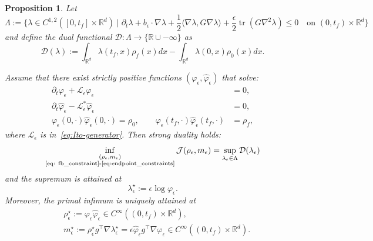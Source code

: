 \documentclass[10pt,a4paper]{amsart}
\newtheorem{proposition}{Proposition}
\newcommand{\R}{\mathbb{R}}
\newcommand{\map}[3]{#1:#2 \rightarrow #3}
\begin{document}
\begin{proposition}\label{prop: Strong duality and attainment}
Let 
\begin{equation}\label{eq: dual_set_thm}
 \Lambda := \Bigg\{ \lambda \in C^{1,2}([0,t_f]\times\mathbb{R}^d) \;\Bigg|\; \partial_t\lambda + b_\epsilon\cdot\nabla\lambda + \frac12\langle \nabla\lambda, G\nabla\lambda\rangle + \frac{\epsilon}{2}\operatorname{tr}(G\nabla^2\lambda) \le 0 \quad \text{on } (0,t_f)\times\mathbb{R}^d \Bigg\}   
\end{equation}
and define the dual functional $\map{\mathcal D}{\Lambda}{\{\R\cup-\infty\}}$ as
\begin{equation}\label{eq:dual-func-thm}
\mathcal D(\lambda):=\int_{\R^d}\lambda(t_f,x)\rho_f(x) dx
-\int_{\R^d}\lambda(0,x)\rho_0(x) dx.
\end{equation}

Assume that there exist strictly positive functions $(\varphi_\epsilon,\hat\varphi_\epsilon)$ that solve: %
\begin{subequations}\label{eq:Schr-system-thm}
\begin{align}
\partial_t\varphi_\epsilon + \mathcal L_\epsilon \varphi_\epsilon &=0,\label{eq:Schr-fwd}\\
\partial_t\hat\varphi_\epsilon - \mathcal L_\epsilon^* \hat\varphi_\epsilon &=0,\label{eq:Schr-bwd}\\
\varphi_\epsilon(0,\cdot)\hat\varphi_\epsilon(0,\cdot)=\rho_0,\qquad
\varphi_\epsilon(t_f,\cdot)\hat\varphi_\epsilon(t_f,\cdot)&=\rho_f,\label{eq:Schr-bc}
\end{align}
\end{subequations}
where $\mathcal L_\epsilon$ is in~\eqref{eq:Ito-generator}. Then strong duality holds: 
\[ 
\inf_{\substack{(\rho_{\epsilon}, m_{\epsilon}) \\ \text{\eqref{eq: fb_constraint}-\eqref{eq:endpoint_constraints}}}} 
\mathcal{J}(\rho_{\epsilon}, m_{\epsilon}) = \sup_{\lambda_{\epsilon}\in\Lambda}\mathcal D(\lambda_{\epsilon})
\]
and the supremum is attained at
\begin{equation}\label{eq:optimal-dual}
\lambda_\epsilon^\star:=\epsilon\log\varphi_\epsilon.
\end{equation}
Moreover, the primal infimum is uniquely attained at
\begin{align}\label{eq:optimal-primal}
&\rho_\epsilon^\star:=\varphi_\epsilon\hat\varphi_\epsilon\in C^\infty((0,t_f)\times\R^d),\nonumber\\\
&m_\epsilon^\star:=\rho_\epsilon^\star g^\top\nabla\lambda_\epsilon^\star = \epsilon \hat\varphi_\epsilon g^\top\nabla\varphi_\epsilon\in C^\infty((0,t_f)\times\R^d).
\end{align}    
\end{proposition}
\end{document}
